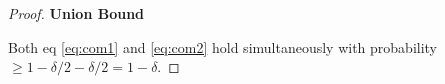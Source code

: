 \documentclass[letterpaper]{article} %
\begin{document}
\begin{proof}




\textbf{Union Bound}

Both  eq \ref{eq:com1} and \ref{eq:com2} hold simultaneously with probability $\geq 1 - \delta/2 - \delta/2 = 1-\delta$.    




\end{proof}
\end{document}
